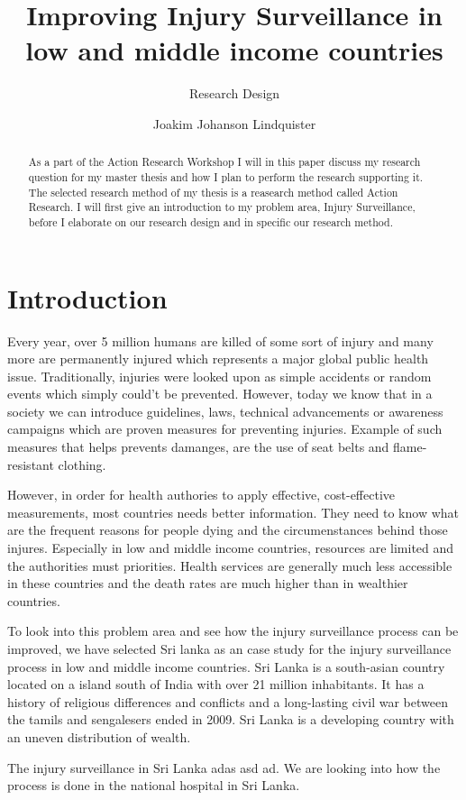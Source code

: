\documentclass[UKenglish, 12pt]{article}
\title{Improving Injury Surveillance in low and middle income countries}
\subtitle{Research Design}
\author{Joakim Johanson Lindquister}
\begin{document}
\ififorside{}

\begin{abstract}
As a part of the Action Research Workshop I will in this paper discuss my research question for my master thesis and how I plan to perform the research supporting it. The selected research method of my thesis is a reasearch method called Action Research. I will first give an introduction to my problem area, Injury Surveillance, before I elaborate on our research design and in specific our research method.
\end{abstract}

\section*{Introduction} 
Every year, over 5 million humans are killed of some sort of injury and many more are permanently injured\cite[site~12]{who-guide} which represents a major global public health issue. Traditionally, injuries were looked upon as simple accidents or random events which simply could't be prevented. However, today we know that in a society we can introduce guidelines, laws, technical advancements or awareness campaigns which are proven measures for preventing injuries. Example of such measures that helps prevents damanges, are the use of seat belts and flame-resistant clothing.

However, in order for health authories to apply effective, cost-effective measurements, most countries needs better information. They need to know what are the frequent reasons for people dying and the circumenstances behind those injures. Especially in low and middle income countries, resources are limited and the authorities must priorities. Health services are generally much less accessible in these countries and the death rates are much higher than in wealthier countries.

To look into this problem area and see how the injury surveillance process can be improved, we have selected Sri lanka as an case study for the injury surveillance process in low and middle income countries. Sri Lanka is a south-asian country located on a island south of India with over 21 million inhabitants\cite{snl-sri-lanka}. It has a history of religious differences and conflicts and a long-lasting civil war between the tamils and sengalesers ended in 2009. Sri Lanka is a developing country with an uneven distribution of wealth.

The injury surveillance in Sri Lanka adas asd ad. We are looking into how the process is done in the national hospital in Sri Lanka.
\end{document}
